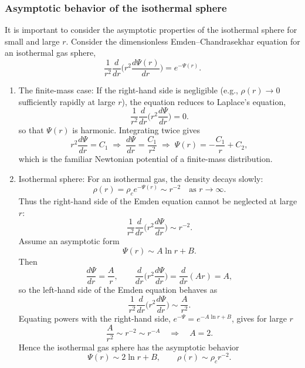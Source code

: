 \documentclass[12pt,a4paper]{article}
\numberwithin{equation}{section}
\begin{document}
\subsubsection{Asymptotic behavior of the isothermal sphere}
It is important to consider the asymptotic properties of the isothermal sphere for small and large $r$. Consider the dimensionless Emden--Chandrasekhar equation for an isothermal gas sphere,
\begin{equation}
\frac{1}{r^2}\frac{d}{dr}\Big(r^2 \frac{d\Psi(r)}{dr}\Big) = e^{-\Psi(r)}.
\end{equation}
\begin{enumerate}
\item The finite-mass case: If the right-hand side is negligible (e.g., $\rho(r) \to 0$ sufficiently rapidly at large $r$), the equation reduces to Laplace's equation,
\begin{equation*}
\frac{1}{r^2}\frac{d}{dr}\Big(r^2 \frac{d\Psi}{dr}\Big) = 0.
\end{equation*}
so that $\Psi(r)$ is harmonic. Integrating twice gives
\begin{equation*}
r^2 \frac{d\Psi}{dr} = C_1 \;\Rightarrow\; \frac{d\Psi}{dr} = \frac{C_1}{r^2} \;\Rightarrow\; \Psi(r) = -\frac{C_1}{r} + C_2,
\end{equation*}
which is the familiar Newtonian potential of a finite-mass distribution.
\item Isothermal sphere: For an isothermal gas, the density decays slowly:
\begin{equation*}
\rho(r) = \rho_c e^{-\Psi(r)} \sim r^{-2} \quad \text{as } r \to \infty.
\end{equation*}
Thus the right-hand side of the Emden equation cannot be neglected at large $r$:
\begin{equation*}
\frac{1}{r^2}\frac{d}{dr}\Big(r^2 \frac{d\Psi}{dr}\Big) \sim r^{-2}.
\end{equation*}
Assume an asymptotic form
\begin{equation*}
\Psi(r) \sim A \ln r + B.
\end{equation*}
Then
\begin{equation*}
\frac{d\Psi}{dr} = \frac{A}{r}, \qquad \frac{d}{dr}\big(r^2 \frac{d\Psi}{dr}\big) = \frac{d}{dr}(A r) = A,
\end{equation*}
so the left-hand side of the Emden equation behaves as
\begin{equation*}
\frac{1}{r^2}\frac{d}{dr}\big(r^2 \frac{d\Psi}{dr}\big) \sim \frac{A}{r^2}.
\end{equation*}
Equating powers with the right-hand side, $e^{-\Psi}=e^{-A\ln r+B}$, gives for large $r$
\begin{equation*}
\frac{A}{r^2} \sim r^{-2}\sim r^{-A} \quad \Rightarrow \quad A = 2.
\end{equation*}
Hence the isothermal gas sphere has the asymptotic behavior
\begin{equation*}
\Psi(r) \sim 2 \ln r + B, \qquad
\rho(r) \sim \rho_c r^{-2}.
\end{equation*}


\end{enumerate}
\end{document}
